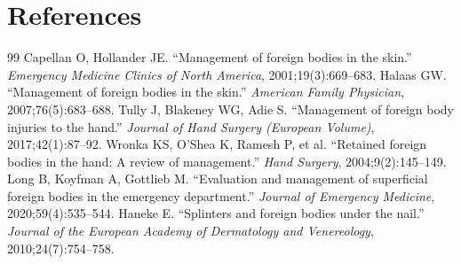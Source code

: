 \section*{References}
\begin{thebibliography}{99}
 Capellan O, Hollander JE. ``Management of foreign bodies in the skin.'' \textit{Emergency Medicine Clinics of North America}, 2001;19(3):669--683.
 Halaas GW. ``Management of foreign bodies in the skin.'' \textit{American Family Physician}, 2007;76(5):683--688.
 Tully J, Blakeney WG, Adie S. ``Management of foreign body injuries to the hand.'' \textit{Journal of Hand Surgery (European Volume)}, 2017;42(1):87--92.
 Wronka KS, O'Shea K, Ramesh P, et al. ``Retained foreign bodies in the hand: A review of management.'' \textit{Hand Surgery}, 2004;9(2):145--149.
 Long B, Koyfman A, Gottlieb M. ``Evaluation and management of superficial foreign bodies in the emergency department.'' \textit{Journal of Emergency Medicine}, 2020;59(4):535--544.
 Haneke E. ``Splinters and foreign bodies under the nail.'' \textit{Journal of the European Academy of Dermatology and Venereology}, 2010;24(7):754--758.
\end{thebibliography}
